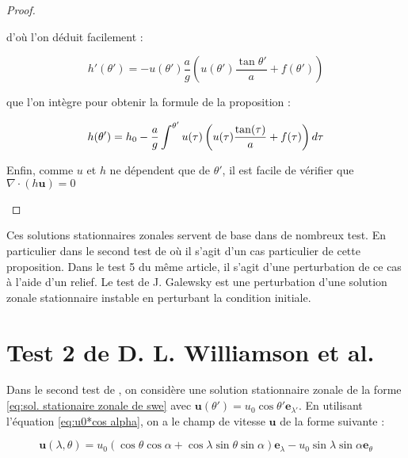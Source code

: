 \begin{proof}
\begin{itemize}
d'où l'on déduit facilement :

\begin{equation}
h'(\theta') = - u(\theta') \dfrac{a}{g} \left( u(\theta') \dfrac{\tan \theta'}{a} + f(\theta') \right)
\end{equation}

que l'on intègre pour obtenir la formule de la proposition :

\begin{equation}
h(\theta') = h_0 - \dfrac{a}{g} \displaystyle\int^{\theta'} u(\tau) \left( u(\tau) \dfrac{\tan (\tau)}{a} + f(\tau) \right) d\tau
\end{equation}

Enfin, comme $u$ et $h$ ne dépendent que de $\theta'$, il est facile de vérifier que $\nabla \cdot \left( h \mathbf{u} \right)=0$
\end{itemize}
\end{proof}

Ces solutions stationnaires zonales servent de base dans de nombreux test. En particulier dans le second test de \cite{Williamson1992} où il s'agit d'un cas particulier de cette proposition. Dans le test 5 du même article, il s'agit d'une perturbation de ce cas à l'aide d'un relief.
Le test de J. Galewsky \cite{Galewsky2004} est une perturbation d'une solution zonale stationnaire instable en perturbant la condition initiale.




















\section{Test 2 de D. L. Williamson et al.}

Dans le second test de \cite{Williamson1992}, on considère une solution stationnaire zonale de la forme \eqref{eq:sol. stationaire zonale de swe} avec $\mathbf{u}(\theta')=u_0 \cos \theta' \mathbf{e}_{\lambda'}$. En utilisant l'équation \eqref{eq:u0*cos alpha}, on a le champ de vitesse $\mathbf{u}$ de la forme suivante :

\begin{equation}
\mathbf{u}(\lambda, \theta) = u_0 \left( \cos \theta \cos \alpha + \cos \lambda \sin \theta \sin \alpha \right) \mathbf{e}_{\lambda} - u_0 \sin \lambda \sin \alpha \mathbf{e}_{\theta}
\label{eq: williamson 2 initial velocity}
\end{equation} 

